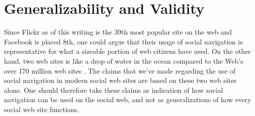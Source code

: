 \section{Generalizability and Validity}

Since Flickr as of this writing is the 39th most popular site on the web
and Facebook is placed 8th,%
one could argue that their usage of social navigation is representative
for what a sizeable portion of web citizens have used. On the other hand, two
web sites is like a drop of water in the ocean compared to the Web's over
170 million web sites \citep{netcraft08}. The claims that we've made
regarding the use of social navigation in modern social web sites are based
on these two web sites alone. One should therefore take these claims
as indication of how social navigation can be used on the social web, and not
as generalizations of how every social web site functions.
